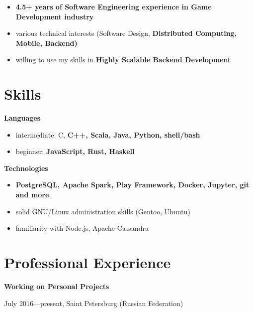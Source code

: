 \begin{itemize}[rightmargin=\dimexpr\linewidth-18cm-\leftmargin\relax]
    \item \bfseries 4.5+ years \mdseries of Software Engineering experience in Game Development industry
    \item various technical interests (Software Design, \bfseries Distributed Computing\mdseries, Mobile, \bfseries Backend\mdseries)
    \item willing to use my skills in \bfseries Highly Scalable Backend \mdseries Development
\end{itemize}

\section*{Skills}

    \bfseries Languages\mdseries
    \begin{itemize}[rightmargin=\dimexpr\linewidth-17.5cm-\leftmargin\relax]
        \item intermediate:
            C,
            \bfseries C++\mdseries,
            Scala,
            Java,
            Python,
            shell/bash
        \item beginner: \bfseries JavaScript\mdseries, Rust, Haskell
    \end{itemize}

    \vspace{0.4cm}
    \bfseries Technologies\mdseries
    \begin{itemize}[rightmargin=\dimexpr\linewidth-17.5cm-\leftmargin\relax]
        \item \bfseries PostgreSQL\mdseries, Apache Spark, Play Framework, \bfseries Docker\mdseries, Jupyter, git and more
        \item solid GNU/Linux administration skills (Gentoo, Ubuntu)
        \item familiarity with Node.js, Apache Cassandra
    \end{itemize}

\section*{Professional Experience}

{
\fontsize{12pt}{12pt}\selectfont
\bfseries Working on Personal Projects\mdseries
}

{
\fontsize{9pt}{8pt}\selectfont
July 2016---present, Saint Petersburg (Russian Federation)
}

